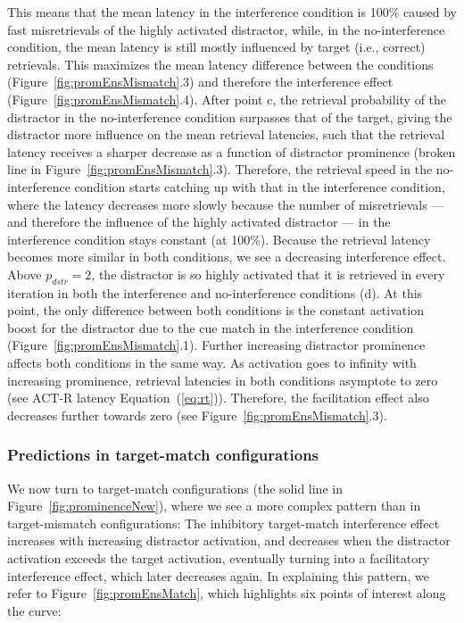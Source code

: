 \documentclass{cambridge7A}\usepackage[]{graphicx}\usepackage[]{color}
\begin{document}
This means that the mean latency in the interference condition is 100\% caused by fast misretrievals of the highly activated distractor, while, in the no-interference condition, the mean latency is still mostly influenced by target (i.e., correct) retrievals.
This maximizes the mean latency difference between the conditions (Figure~\ref{fig:promEnsMismatch}.3) and therefore the interference effect (Figure~\ref{fig:promEnsMismatch}.4). 
After point c, the retrieval probability of the distractor in the no-interference condition surpasses that of the target, giving the distractor more influence on the mean retrieval latencies, such that the retrieval latency receives a sharper decrease as a function of distractor prominence (broken line in Figure~\ref{fig:promEnsMismatch}.3).
Therefore, the retrieval speed in the no-interference condition starts catching up with that in the interference condition, where the latency decreases more slowly because the number of misretrievals --- and therefore the influence of the highly activated distractor --- in the interference condition stays constant (at 100\%).
Because the retrieval latency becomes more similar in both conditions, we see a decreasing interference effect.
Above $p_{dstr}=2$, the distractor is so highly activated that it is retrieved in every iteration in both the interference and no-interference conditions (d). At this point, the only difference between both conditions is the constant activation boost for the distractor due to the cue match in the interference condition (Figure~\ref{fig:promEnsMismatch}.1). Further increasing distractor prominence affects both conditions in the same way.
As activation goes to infinity with increasing prominence, retrieval latencies in both conditions asymptote to zero (see ACT-R latency Equation~(\ref{eq:rt})). Therefore, the facilitation effect also decreases further towards zero (see Figure~\ref{fig:promEnsMismatch}.3).

\subsubsection{Predictions in target-match configurations}
We now turn to  target-match configurations (the solid line in Figure~\ref{fig:prominenceNew}), where we see a more complex pattern than in target-mismatch configurations:
The inhibitory target-match interference effect increases with increasing distractor activation, and decreases when the distractor activation exceeds the target activation, eventually turning into a  facilitatory interference effect, which later decreases again.
In explaining this pattern, we refer to Figure~\ref{fig:promEnsMatch}, which highlights six points of interest along the curve:
\end{document}
